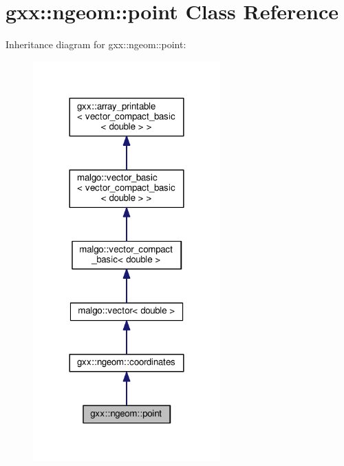 \hypertarget{classgxx_1_1ngeom_1_1point}{}\section{gxx\+:\+:ngeom\+:\+:point Class Reference}
\label{classgxx_1_1ngeom_1_1point}


Inheritance diagram for gxx\+:\+:ngeom\+:\+:point\+:
\nopagebreak
\begin{figure}[H]
\begin{center}
\leavevmode
\includegraphics[width=204pt]{classgxx_1_1ngeom_1_1point__inherit__graph}
\end{center}
\end{figure}


